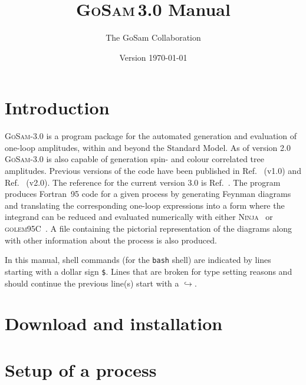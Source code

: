 \documentclass[11pt,a4paper, oneside]{scrbook}
\title{\textsc{GoSam}\,3.0 Manual}
\author{The GoSam Collaboration}
\date{Version \today}
\newcommand{\gosamversion}{{3{.}0}}
\newcommand{\gosamv}[1][\gosamversion]{\textsc{GoSam}-#1\xspace}
\newcommand{\golemVC}{\textsc{golem95C}\xspace}
\newcommand{\fortranXC}{Fortran~95\xspace}
\newcommand{\ninja}{\textsc{Ninja}\xspace}
\newcommand{\contl}{{\ensuremath{\hookrightarrow}}}
\begin{document}
\maketitle
\tableofcontents


\chapter{Introduction}
\gosamv is a program package for the automated generation and evaluation of one-loop amplitudes, within and beyond the Standard Model. As of version 2.0 \gosamv is also capable of generation spin- and colour correlated tree amplitudes. Previous versions of the code have been published in Ref.~\cite{Cullen:2011ac} (v1.0) and Ref.~\cite{Cullen:2014yla} (v2.0). The reference for the current version 3.0 is Ref.~\cite{GoSam3}. The program produces \fortranXC code for a given process
by generating Feynman diagrams and translating
the corresponding one-loop expressions into a form where the integrand
can be reduced and evaluated numerically with either
\ninja~\cite{Mastrolia:2012bu,vanDeurzen:2013saa,Peraro:2014cba}
or \golemVC~\cite{Golem95:2008,Cullen:2011kv,Guillet:2013msa}.
A file containing the pictorial representation of the diagrams along with other information 
about the process is also produced. 

\vspace*{3mm}

In this manual, shell commands 
(for the \texttt{bash} shell) are indicated
by lines starting with a dollar sign \texttt{\$}.
Lines that are broken for type setting reasons and should
continue the previous line(s) start with a \contl.

\chapter{Download and installation}


\chapter{Setup of a process}
\label{chp:setup-of-a-process}

\end{document}

